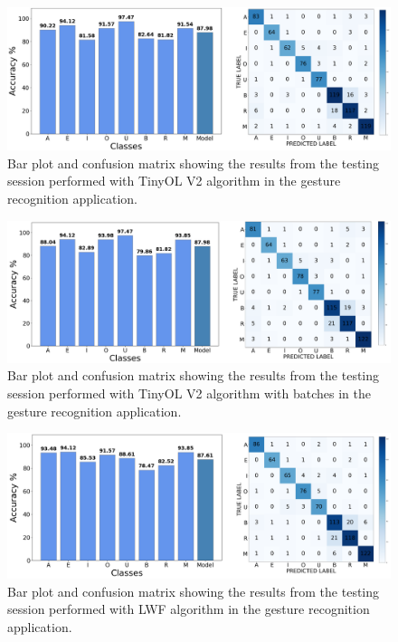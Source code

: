 \documentclass[12pt]{report}
\begin{document}
\begin{figure}[h!]
    \centering
    \includegraphics[width=140mm]{Figures/Chapter5/STM_barPlot_OL_V2.png} 
    \caption{Bar plot and confusion matrix showing the results from the testing session performed with TinyOL V2 algorithm in the gesture recognition application.}
    \label{fig:letter_res_OL_v2}    
\end{figure}

\begin{figure}[h!]
    \centering
    \includegraphics[width=140mm]{Figures/Chapter5/STM_barPlot_OL_V2_batch.png} 
    \caption{Bar plot and confusion matrix showing the results from the testing session performed with TinyOL V2 algorithm with batches in the gesture recognition application.}
    \label{fig:letter_res_OL_v2_batch}    
\end{figure}

\begin{figure}[h!]
    \centering
    \includegraphics[width=140mm]{Figures/Chapter5/STM_barPlot_LWF.png} 
    \caption{Bar plot and confusion matrix showing the results from the testing session performed with LWF algorithm in the gesture recognition application.}
    \label{fig:letter_res_LWF}    
\end{figure}
\end{document}
